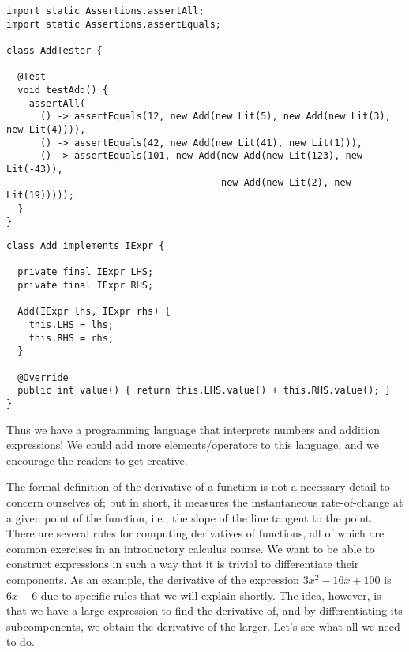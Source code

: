 \begin{lstlisting}[language=MyJava]
import static Assertions.assertAll;
import static Assertions.assertEquals;

class AddTester {

  @Test
  void testAdd() {
    assertAll(
      () -> assertEquals(12, new Add(new Lit(5), new Add(new Lit(3), new Lit(4)))),
      () -> assertEquals(42, new Add(new Lit(41), new Lit(1))),
      () -> assertEquals(101, new Add(new Add(new Lit(123), new Lit(-43)),
                                      new Add(new Lit(2), new Lit(19)))));
  }
}
\end{lstlisting}

\begin{lstlisting}[language=MyJava]
class Add implements IExpr {

  private final IExpr LHS;
  private final IExpr RHS;

  Add(IExpr lhs, IExpr rhs) {
    this.LHS = lhs;
    this.RHS = rhs;
  }

  @Override
  public int value() { return this.LHS.value() + this.RHS.value(); }
}
\end{lstlisting}

Thus we have a programming language that interprets numbers and addition expressions! We could add more elements/operators to this language, and we encourage the readers to get creative.


The formal definition of the derivative of a function is not a necessary detail to concern ourselves of; but in short, it measures the instantaneous rate-of-change at a given point of the function, i.e., the slope of the line tangent to the point. There are several rules for computing derivatives of functions, all of which are common exercises in an introductory calculus course. We want to be able to construct expressions in such a way that it is trivial to differentiate their components. As an example, the derivative of the expression $3x^2 - 16x + 100$ is $6x - 6$ due to specific rules that we will explain shortly. The idea, however, is that we have a large expression to find the derivative of, and by differentiating its subcomponents, we obtain the derivative of the larger. Let's see what all we need to do.

